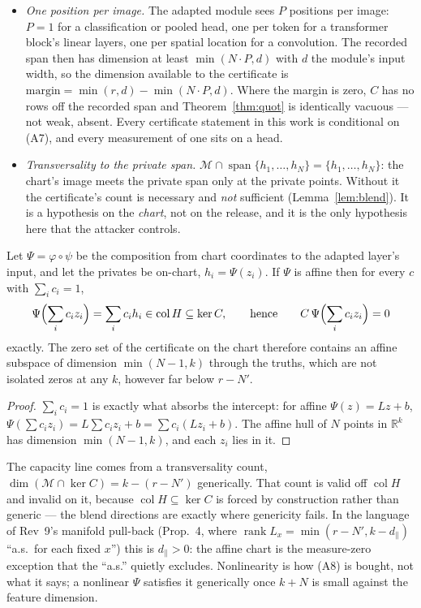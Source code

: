 \begin{itemize}
\item[(A7)] \emph{One position per image.} The adapted module sees $P$
  positions per image: $P=1$ for a classification or pooled head, one per token
  for a transformer block's linear layers, one per spatial location for a
  convolution. The recorded span then has dimension at least
  $\min(N\!\cdot\!P,d)$ with $d$ the module's input width, so the dimension
  available to the certificate is
  $\text{margin}=\min(r,d)-\min(N\!\cdot\!P,d)$. Where the margin is zero,
  $C$ has no rows off the recorded span and Theorem~\ref{thm:quot} is
  identically vacuous --- not weak, absent. Every certificate statement in this
  work is conditional on (A7), and every measurement of one sits on a head.
\item[(A8)] \emph{Transversality to the private span.}
  $\mathcal M\cap\operatorname{span}\{h_1,\dots,h_N\}=\{h_1,\dots,h_N\}$:
  the chart's image meets the private span only at the private points.
  Without it the certificate's count is necessary and \emph{not} sufficient
  (Lemma~\ref{lem:blend}). It is a hypothesis on the \emph{chart}, not on the
  release, and it is the only hypothesis here that the attacker controls.
\end{itemize}

\begin{lemma}\label{lem:blend}
Let $\Psi=\varphi\circ\psi$ be the composition from chart coordinates to the
adapted layer's input, and let the privates be on-chart, $h_i=\Psi(z_i)$. If
$\Psi$ is affine then for every $c$ with $\sum_ic_i=1$,
\[
  \Psi\Bigl(\sum_i c_iz_i\Bigr)=\sum_i c_ih_i\in\operatorname{col}H
  \subseteq\ker C,
  \qquad\text{hence}\qquad C\,\Psi\Bigl(\sum_i c_iz_i\Bigr)=0
\]
exactly. The zero set of the certificate on the chart therefore contains an
affine subspace of dimension $\min(N-1,k)$ through the truths, which are not
isolated zeros at any $k$, however far below $r-N'$.
\end{lemma}

\begin{proof}
$\sum_ic_i=1$ is exactly what absorbs the intercept: for affine
$\Psi(z)=Lz+b$, $\Psi(\sum c_iz_i)=L\sum c_iz_i+b=\sum c_i(Lz_i+b)$. The
affine hull of $N$ points in $\mathbb R^k$ has dimension $\min(N-1,k)$, and
each $z_i$ lies in it.
\end{proof}

\begin{remark}
The capacity line comes from a transversality count, $\dim(\mathcal M\cap\ker
C)=k-(r-N')$ generically. That count is valid off $\operatorname{col}H$ and
invalid on it, because $\operatorname{col}H\subseteq\ker C$ is forced by
construction rather than generic --- the blend directions are exactly where
genericity fails. In the language of Rev~9's manifold pull-back (Prop.~4, where
$\operatorname{rank}L_x=\min(r-N',k-d_\parallel)$ ``a.s.\ for each fixed $x$'')
this is $d_\parallel>0$: the affine chart is the measure-zero exception that the
``a.s.'' quietly excludes. Nonlinearity is how (A8) is bought, not what it
says; a nonlinear $\Psi$ satisfies it generically once $k+N$ is small against
the feature dimension.
\end{remark}


